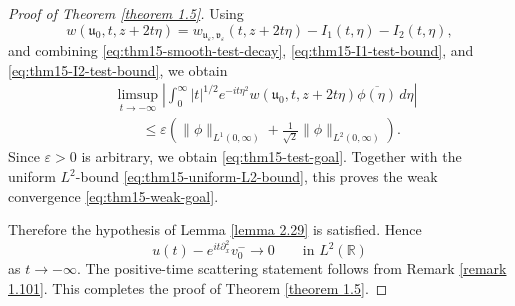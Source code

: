 \documentclass[10pt]{article}
\numberwithin{equation}{section}
\numberwithin{theorem}{section}
\begin{document}
\begin{proof}[Proof of Theorem \ref{theorem 1.5}]
Using
\[
w(\mathfrak u_0,t,z+2t\eta)
=
w_{\mathfrak u_\varepsilon,\mathfrak v_\varepsilon}(t,z+2t\eta)
-
I_1(t,\eta)
-
I_2(t,\eta),
\]
and combining \eqref{eq:thm15-smooth-test-decay},
\eqref{eq:thm15-I1-test-bound}, and \eqref{eq:thm15-I2-test-bound}, we obtain
\begin{equation}
\label{eq:thm15-limsup-estimate}
\begin{aligned}
&\limsup_{t\to-\infty}
\left|
\int_0^\infty
|t|^{1/2}e^{-it\eta^2}
w(\mathfrak u_0,t,z+2t\eta)
\overline{\phi(\eta)}\,d\eta
\right|
\\
&\qquad\le
\varepsilon
\left(
\|\phi\|_{L^1(0,\infty)}
+
\frac1{\sqrt2}\|\phi\|_{L^2(0,\infty)}
\right).
\end{aligned}
\end{equation}
Since \(\varepsilon>0\) is arbitrary, we obtain \eqref{eq:thm15-test-goal}. Together with
the uniform \(L^2\)-bound \eqref{eq:thm15-uniform-L2-bound}, this proves the weak
convergence \eqref{eq:thm15-weak-goal}.

Therefore the hypothesis of Lemma \ref{lemma 2.29} is satisfied. Hence
\[
u(t)-e^{it\partial_x^2}v_0^-
\to0
\qquad\text{in }L^2(\mathbb R)
\]
as \(t\to-\infty\). The positive-time scattering statement follows from Remark
\ref{remark 1.101}. This completes the proof of Theorem \ref{theorem 1.5}.
\end{proof}
\end{document}
